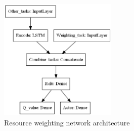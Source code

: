 \begin{figure}
    \centering
    \includegraphics[width=0.5\textwidth]{figures/2_solution_figs/resource_weighting_network_architecture.png}
    \caption{Resource weighting network architecture}
    \label{fig:resource_weighting_network_architecture}
\end{figure}


